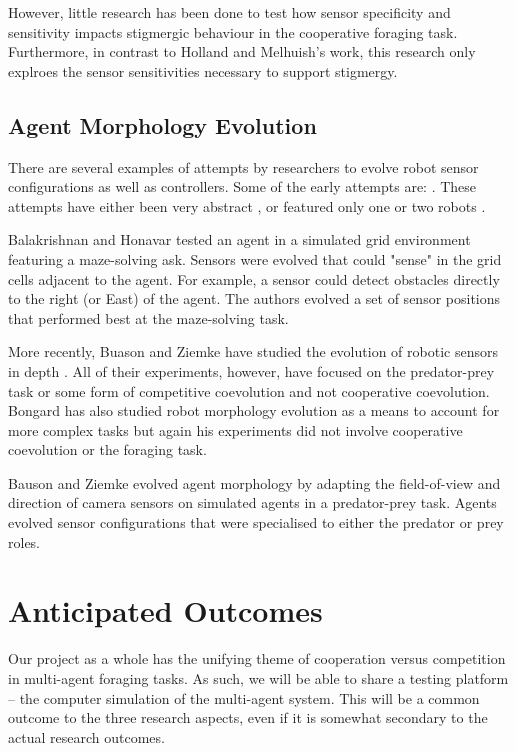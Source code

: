 \documentclass[a4paper,12pt]{article}
\begin{document}
However, little research has been done to test how sensor specificity and sensitivity impacts stigmergic behaviour in the cooperative foraging task. Furthermore, in contrast to Holland and Melhuish's work, this research only explroes the sensor sensitivities necessary to support stigmergy.

\subsection{Agent Morphology Evolution}
There are several examples of attempts by researchers to evolve robot sensor configurations as well as controllers. Some of the early attempts are: \cite{Sims94,Balakrishnan96,Lee:1996}. These attempts have either been very abstract \cite{Balakrishnan96}, or featured only one or two robots \cite{Sims94}.

Balakrishnan and Honavar \cite{Balakrishnan96} tested an agent in a simulated grid environment featuring a maze-solving ask. Sensors were evolved that could "sense" in the grid cells adjacent to the agent. For example, a sensor could detect obstacles directly to the right (or East) of the agent. The authors evolved a set of sensor positions that performed best at the maze-solving task.

More recently, Buason and Ziemke have studied the evolution of robotic sensors in depth \cite{Buason:2003, Buason:2005}. All of their experiments, however, have focused on the predator-prey task or some form of competitive coevolution and not cooperative coevolution. Bongard has also studied robot morphology evolution as a means to account for more complex tasks \cite{Bongard:2009,Bongard:2010} but again his experiments did not involve cooperative coevolution or the foraging task.

Bauson and Ziemke \cite{Buason:2003, Buason:2005} evolved agent morphology by adapting the field-of-view and direction of camera sensors on simulated agents in a predator-prey task. Agents evolved sensor configurations that were specialised to either the predator or prey roles.

\section{Anticipated Outcomes}
Our project as a whole has the unifying theme of cooperation versus competition in multi-agent foraging tasks. As such, we will be able to share a testing platform -- the computer simulation of the multi-agent system. This will be a common outcome to the three research aspects, even if it is somewhat secondary to the actual research outcomes.
\end{document}
